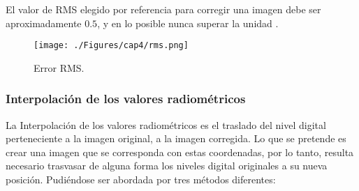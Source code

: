  	El valor de RMS elegido por referencia para corregir una imagen debe ser aproximadamente $ 0.5 $, y en lo posible nunca superar la unidad \cite{guide1999erdas}.
 
 
     \begin{figure}[H]
     	\centering
     	\texttt{[image: ./Figures/cap4/rms.png]}
     	\caption{Error RMS.}
     	\label{fig:rms}
     \end{figure}



\subsubsection{Interpolaci\'on de los valores radiom\'etricos}
La Interpolaci\'on de los valores radiom\'etricos es el traslado del nivel digital perteneciente a la imagen original, a la imagen corregida. Lo que se pretende es crear una imagen que se corresponda con estas coordenadas, por lo tanto, resulta necesario trasvasar de alguna forma los niveles digital originales a su nueva posici\'on. Pudi\'endose ser abordada por tres m\'etodos diferentes:
